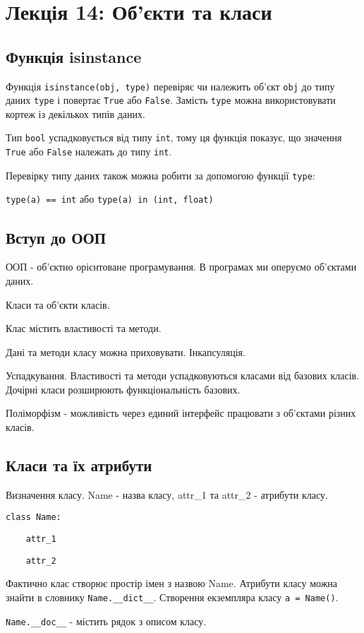\section{Лекція 14: Об’єкти та класи}
\subsection{Функція isinstance} 
\begin{frame}
Функція \texttt{isinstance(obj, type)} перевіряє чи належить об'єкт \texttt{obj} до типу даних \texttt{type} і повертає \texttt{True} або \texttt{False}. Замість \texttt{type} можна використовувати кортеж із декількох типів даних.

Тип \texttt{bool} успадковується від типу \texttt{int}, тому ця функція показує, що значення \texttt{True} або \texttt{False} належать до типу \texttt{int}.

Перевірку типу даних також можна робити за допомогою функції \texttt{type}:

\texttt{type(a) == int} або \texttt{type(a) in (int, float)}  


\end{frame}

\subsection{Вступ до ООП} 

\begin{frame}
ООП - об'єктно орієнтоване програмування. В програмах ми оперуємо об'єктами даних.

Класи та об'єкти класів.

Клас містить властивості та методи.

Дані та методи класу можна приховувати. Інкапсуляція.

Успадкування. Властивості та методи успадковуються класами від базових класів. Дочірні класи розширюють функціональність базових.

Поліморфізм - можливість через единий інтерфейс працювати з об'єктами різних класів.
\end{frame}

\subsection{Класи та їх атрибути} 
\begin{frame}
Визначення класу.
Name - назва класу, attr\_1 та attr\_2 - атрибути класу. 

\texttt{class Name:}

\texttt{~~~~attr\_1}

\texttt{~~~~attr\_2}

 Фактично клас створює простір імен з назвою Name. Атрибути класу можна знайти в словнику \texttt{Name.\_\_dict\_\_}. Створення екземпляра класу \texttt{a = Name()}.
 
 \texttt{Name.\_\_doc\_\_} - містить рядок з описом класу.
\end{frame}

